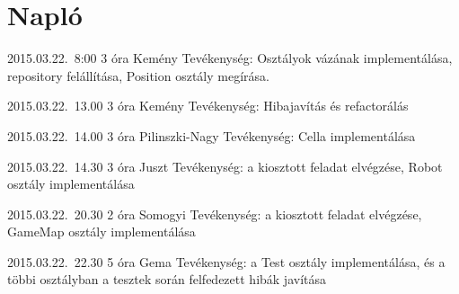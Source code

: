 %
\section{Napló}

\begin{naplo}

\bejegyzes
{2015.03.22.~8:00}
{3 óra}
{Kemény}
{Tevékenység: Osztályok vázának implementálása, repository felállítása, Position osztály megírása.}

\bejegyzes
{2015.03.22.~13.00}
{3 óra}
{Kemény}
{Tevékenység: Hibajavítás és refactorálás}

\bejegyzes
{2015.03.22.~14.00}
{3 óra}
{Pilinszki-Nagy}
{Tevékenység: Cella implementálása}

\bejegyzes
{2015.03.22.~14.30}
{3 óra}
{Juszt}
{Tevékenység: a kiosztott feladat elvégzése, Robot osztály implementálása}

\bejegyzes
{2015.03.22.~20.30}
{2 óra}
{Somogyi}
{Tevékenység: a kiosztott feladat elvégzése, GameMap osztály implementálása}

\bejegyzes
{2015.03.22.~22.30}
{5 óra}
{Gema}
{Tevékenység: a Test osztály implementálása, és a többi osztályban a tesztek során felfedezett hibák javítása}

\end{naplo}

